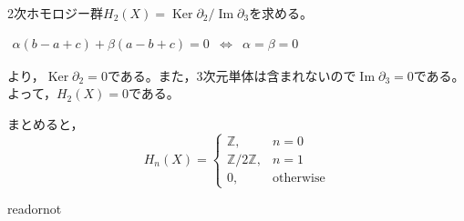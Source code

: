 \documentclass[uplatex]{jsarticle}
\DeclareMathOperator{\Image}{Im}
\DeclareMathOperator{\Kernel}{Ker}
\begin{document}
\begin{rei}[射影平面のホモロジー群]
	2次ホモロジー群$H_{2}(X) = \Kernel \partial_{2} / \Image \partial_{3}$を求める。
	\begin{center}
		$\begin{array}{lcl}
			\alpha (b-a+c) + \beta (a-b+c) = 0 & \Longleftrightarrow & \alpha = \beta = 0
		\end{array}$
	\end{center}
	\renewcommand{\arraystretch}{1.3}
	より，$\Kernel \partial_{2} = 0$である。また，3次元単体は含まれないので$\Image \partial_{3} = 0$である。
	よって，$H_{2} (X) = 0$である。

	まとめると，
	\begin{equation}
		H_{n}(X) = \begin{cases}
			\mathbb{Z}, & n=0 \\
			\mathbb{Z} / 2 \mathbb{Z}, & n=1 \\
			0, & \text{otherwise}
		\end{cases}
	\end{equation}
\end{rei}

	

\expandafter\ifx\csname readornot\endcsname\relax
  
\end{document}

